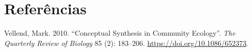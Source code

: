 \documentclass[
  brazilian,
  letterpaper,
  DIV=11,
  numbers=noendperiod]{scrartcl}
\newlength{\cslhangindent}
\newenvironment{CSLReferences}[2] %
 {\begin{list}{}{%
  \setlength{\itemindent}{0pt}
  \setlength{\leftmargin}{0pt}
  \setlength{\parsep}{0pt}
  \ifodd #1
   \setlength{\leftmargin}{\cslhangindent}
   \setlength{\itemindent}{-1\cslhangindent}
  \fi
  \setlength{\itemsep}{#2\baselineskip}}}
 {\end{list}}
\begin{document}
\section*{Referências}\label{referuxeancias}

\protect{}\label{refs}
\begin{CSLReferences}{1}{1}
Vellend, Mark. 2010. {``Conceptual Synthesis in Community Ecology''}.
\emph{The Quarterly Review of Biology} 85 (2): 183--206.
\url{https://doi.org/10.1086/652373}.

\end{CSLReferences}
\end{document}

